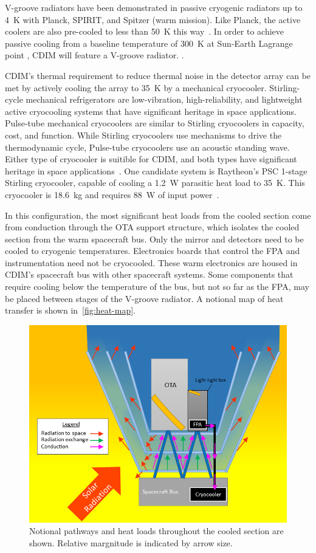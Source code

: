 \documentclass{ws-jai}
\begin{document}
V-groove radiators have been demonstrated in passive cryogenic radiators up to \SI{4}{\kelvin} with Planck, SPIRIT, and Spitzer (warm mission).\@
Like Planck, the active coolers are also pre-cooled to less than \SI{50}{\kelvin} this way~\cite{shinozaki2014spica}.
In order to achieve passive cooling from a baseline temperature of \SI{300}{\kelvin} at Sun-Earth Lagrange point \Ltwo, CDIM will feature a  V-groove radiator.
.

CDIM's thermal requirement to reduce thermal noise in the detector array can be met by actively cooling the array to \SI{35}{\kelvin} by a mechanical cryocooler.
Stirling-cycle mechanical refrigerators are low-vibration, high-reliability, and lightweight active cryocooling systems that have significant heritage in space applications.
Pulse-tube mechanical cryocoolers are similar to Stirling cryocoolers in capacity, cost, and function.
While Stirling cryocoolers use mechanisms to drive the thermodynamic cycle, Pulse-tube cryocoolers use an acoustic standing wave.
Either type of cryocooler is suitible for CDIM, and both types have significant heritage in space applications~\cite{gilmore2003spacecraft}.
One candidate system is Raytheon's PSC 1-stage Stirling cryocooler, capable of cooling a \SI{1.2}{\watt} parasitic heat load to \SI{35}{\kelvin}.
This cryocooler is \SI{18.6}{\kilo\gram} and requires \SI{88}{\watt} of input power~\cite{ross2005cryocoolers}.

In this configuration, the most significant heat loads from the cooled section come from conduction through the OTA support structure, which isolates the cooled section from the warm spacecraft bus.
Only the mirror and detectors need to be cooled to cryogenic temperatures.
Electronics boards that control the FPA and instrumentation need not be cryocooled.
These warm electronics are housed in CDIM's spacecraft bus with other spacecraft systems.
Some components that require cooling below the temperature of the bus, but not so far as the FPA, may be placed between stages of the V-groove radiator.
A notional map of heat transfer is shown in~\autoref{fig:heat-map}.

\begin{figure}[!ht]
  \centering
  \includegraphics[width=.6\linewidth]{figs/heat-map.png}
  \caption{Notional pathways and heat loads throughout the cooled section are shown. Relative margnitude is indicated by arrow size.
\label{fig:heat-map}
}
\end{figure}
\end{document}
